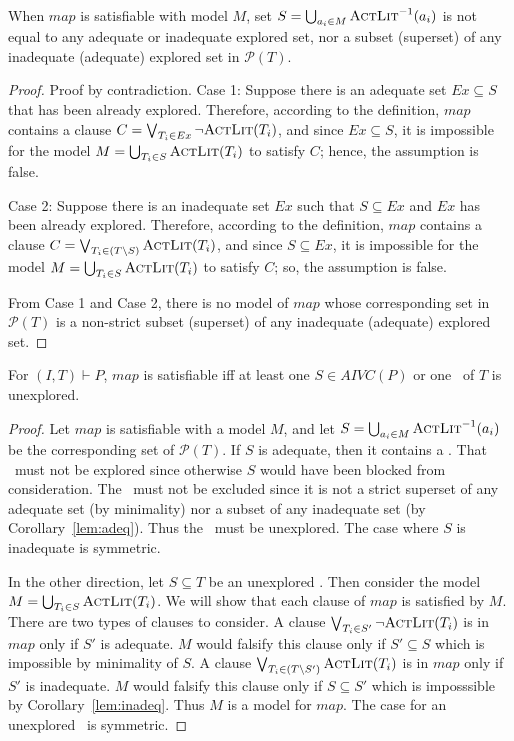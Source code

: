 \begin{lemma}
\label{lem:map:sound}
When $map$ is satisfiable with model $M$, set $S = \bigcup_{a_i \in M} \textsc{ActLit} ^{-1} (a_i)$ is not equal to any adequate or inadequate explored set, nor a subset (superset) of any
inadequate (adequate) explored set in $\mathcal{P}(T)$.
\end{lemma}
\begin{proof}
Proof by contradiction. Case 1: Suppose there is an adequate set $Ex \subseteq S$ that has been already explored. Therefore, according to the definition, $map$ contains a clause $C = \bigvee_{T_{i}\in Ex} \neg {\textsc{ActLit}(T_i)}$, and since $Ex \subseteq S$, it is impossible for the model $M = \bigcup_{T_i \in S} \textsc{ActLit} (T_i)$ to satisfy $C$; hence, the assumption is false.

Case 2: Suppose there is an inadequate set $Ex$ such that $S \subseteq Ex$ and $Ex$ has been already explored. Therefore, according to the definition, $map$ contains a clause $C = \bigvee_{T_{i}\in (T \setminus S)} \textsc{ActLit} (T_i)$, and since $S \subseteq Ex$, it is impossible for the model $M = \bigcup_{T_i \in S} \textsc{ActLit} (T_i)$ to satisfy $C$; so, the assumption is false.

From Case 1 and Case 2, there is no model of $map$ whose corresponding set in $\mathcal{P}(T)$ is a non-strict subset (superset) of any inadequate (adequate) explored set.
\end{proof}


\begin{lemma}
\label{lem:map:comp}
For $(I, T) \vdash P$, $map$ is satisfiable iff
at least one $S \in AIVC(P)$ or one \mis\ of $T$ is unexplored.
\end{lemma}
\begin{proof}
Let $map$ is satisfiable with a model $M$, and let $S = \bigcup_{a_i
  \in M} \textsc{ActLit} ^{-1} (a_i)$ be the corresponding set of
$\mathcal{P}(T)$. If $S$ is adequate, then it contains a \mivc. That
\mivc\ must not be explored since otherwise $S$ would have been blocked
from consideration. The \mivc\ must not be excluded since it is not a
strict superset of any adequate set (by minimality) nor a subset of
any inadequate set (by Corollary~\ref{lem:adeq}). Thus the \mivc\ must
be unexplored. The case where $S$ is inadequate is symmetric.

In the other direction, let $S \subseteq T$ be an unexplored \mivc.
Then consider the model $M = \bigcup_{T_i\in S} \textsc{ActLit}(T_i)$. We will
show that each clause of $map$ is satisfied by $M$. There are two
types of clauses to consider. A clause $\bigvee_{T_{i}\in S'} \neg
{\textsc{ActLit}(T_i)}$ is in $map$ only if $S'$ is adequate. $M$ would
falsify this clause only if $S' \subseteq S$ which is impossible by
minimality of $S$. A clause $\bigvee_{T_{i}\in (T \setminus S')}
\textsc{ActLit} (T_i)$ is in $map$ only if $S'$ is inadequate. $M$ would
falsify this clause only if $S \subseteq S'$ which is imposssible by
Corollary~\ref{lem:inadeq}. Thus $M$ is a model for $map$. The case
for an unexplored \mis\ is symmetric.
\end{proof}


